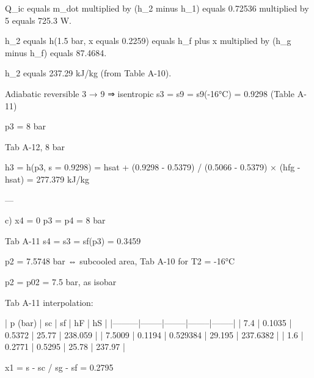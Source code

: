 Q_ic equals m_dot multiplied by (h_2 minus h_1) equals 0.72536 multiplied by 5 equals 725.3 W.  

h_2 equals h(1.5 bar, x equals 0.2259) equals h_f plus x multiplied by (h_g minus h_f) equals 87.4684.  

h_2 equals 237.29 kJ/kg (from Table A-10).

Adiabatic reversible 3 → 9 ⇒ isentropic  
s3 = s9 = s9(-16°C) = 0.9298 (Table A-11)  

p3 = 8 bar  

Tab A-12, 8 bar  

h3 = h(p3, s = 0.9298) = hsat + (0.9298 - 0.5379) / (0.5066 - 0.5379) × (hfg - hsat) = 277.379 kJ/kg  

---

c)  
x4 = 0  
p3 = p4 = 8 bar  

Tab A-11  
s4 = s3 = sf(p3) = 0.3459  

p2 = 7.5748 bar ⇔ subcooled area, Tab A-10 for T2 = -16°C  

p2 = p02 = 7.5 bar, as isobar  

Tab A-11 interpolation:  

| p (bar) | sc     | sf     | hF     | hS     |  
|---------|--------|--------|--------|--------|  
| 7.4     | 0.1035 | 0.5372 | 25.77  | 238.059 |  
| 7.5009  | 0.1194 | 0.529384 | 29.195 | 237.6382 |  
| 1.6     | 0.2771 | 0.5295 | 25.78  | 237.97  |  

x1 = s - sc / sg - sf = 0.2795